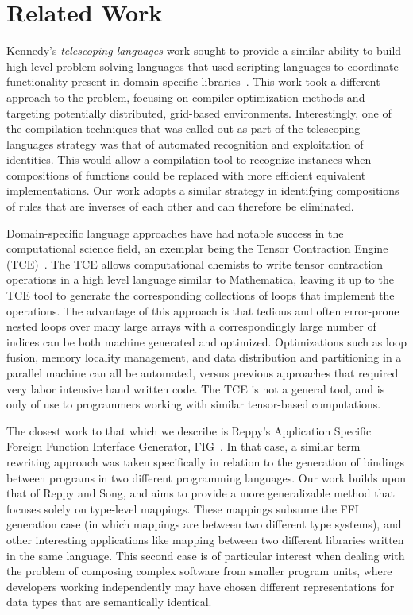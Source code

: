 
\section{Related Work}

Kennedy's \emph{telescoping languages} work sought to provide a
similar ability to build high-level problem-solving languages that
used scripting languages to coordinate functionality present in
domain-specific libraries~\cite{kennedy00telescoping}.  This work took
a different approach to the problem, focusing on compiler optimization
methods and targeting potentially distributed, grid-based
environments.  Interestingly, one of the compilation techniques that
was called out as part of the telescoping languages strategy was that
of automated recognition and exploitation of identities.  This would
allow a compilation tool to recognize instances when compositions of
functions could be replaced with more efficient equivalent
implementations.  Our work adopts a similar strategy in identifying
compositions of rules that are inverses of each other and can
therefore be eliminated.

Domain-specific language approaches have had notable success in the
computational science field, an exemplar being the Tensor Contraction
Engine (TCE)~\cite{baumgartner05synthesis}.  The TCE allows
computational chemists to write tensor contraction operations in a
high level language similar to Mathematica, leaving it up to the TCE
tool to generate the corresponding collections of loops that implement
the operations.  The advantage of this approach is that tedious and
often error-prone nested loops over many large arrays with a
correspondingly large number of indices can be both machine generated
and optimized.  Optimizations such as loop fusion, memory locality
management, and data distribution and partitioning in a parallel
machine can all be automated, versus previous approaches that required
very labor intensive hand written code.  The TCE is not a general
tool, and is only of use to programmers working with similar
tensor-based computations.

The closest work to that which we describe is Reppy's Application
Specific Foreign Function Interface Generator, FIG~\cite{reppy06fig}.
In that case, a similar term rewriting approach was taken specifically
in relation to the generation of bindings between programs in two
different programming languages.  Our work builds upon that of Reppy
and Song, and aims to provide a more generalizable method that focuses
solely on type-level mappings.  These mappings subsume the FFI
generation case (in which mappings are between two different type
systems), and other interesting applications like mapping between two
different libraries written in the same language.  This second case is
of particular interest when dealing with the problem of composing
complex software from smaller program units, where developers working
independently may have chosen different representations for data types
that are semantically identical.

